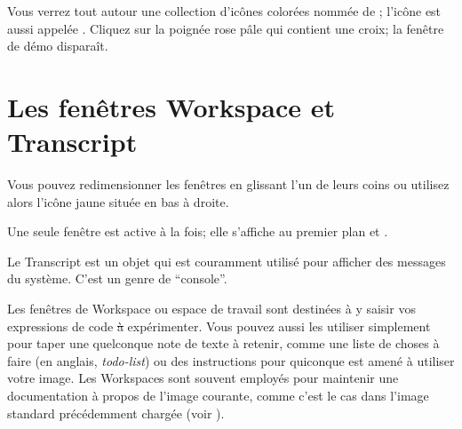 \documentclass[a4paper,10pt,twoside]{book}
\begin{document}
Vous verrez tout autour une collection d'icônes  colorées
nommée %
 de \bam; l'icône
 est aussi appelée .
Cliquez sur la poignée rose pâle qui contient une croix; la fenêtre
de démo disparaît. %

\section{Les fenêtres Workspace et Transcript}

Vous pouvez redimensionner les fenêtres en glissant l'un de leurs
coins ou  utilisez alors l'icône jaune située en bas à droite.

Une seule fenêtre est active à la fois; elle s'affiche au premier plan
et . %

Le Transcript est un objet qui est couramment utilisé pour afficher
des messages du système. C'est un genre de ``console''.

Les fenêtres de Workspace ou espace de travail sont destinées à
y saisir vos expressions de code \st à expérimenter.
Vous pouvez aussi les utiliser simplement pour taper une quelconque
note de texte à retenir, comme une liste de choses à faire (en
anglais, \emph{todo-list}) ou des instructions pour quiconque est
amené à utiliser votre image.
Les Workspaces sont souvent employés pour maintenir une
documentation à propos de l'image courante, comme c'est le cas
dans l'image standard précédemment chargée (voir
).
\end{document}
